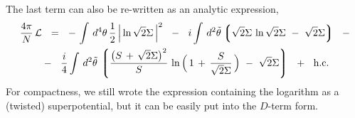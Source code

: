 \documentclass[epsfig,12pt]{article}
\newcommand{\cell}{{\mathcal L}}
\newcommand{\lgr}{\left\lgroup}
\newcommand{\rgr}{\right\rgroup}
\begin{document}
	The last term can also be re-written as an analytic expression,
\begin{align}
%
\notag
	\frac{4\pi}{N}\, \cell &    ~~=~~     
			-\,
			\int\, d^4\theta\, \frac{1}{2}\, \Big| \ln \sqrt{2}\Sigma \, \Big|^2
			~~-~~
			i \int\, d^2\tilde\theta 
			\lgr
			\sqrt{2}\Sigma\, \ln \sqrt{2}\Sigma  ~-~ \sqrt{2}\Sigma
			\rgr
			~~-
	\\
%
\label{Lsuper}
			&
			-~~ 
			\frac{i}{4} \int\, d^2\tilde\theta\,
			\lgr \frac{ \big( S \,+\, \sqrt{2}\Sigma \big)^2 }{ S }\,
				\ln \Big(\, 1 \,+\, \frac{S}{\sqrt{2}\Sigma} \,\Big) ~-~
				\sqrt{2}\Sigma \rgr
			~~+~~ \text{h.c.}
\end{align}
	For compactness, we still wrote the expression containing the logarithm as a (twisted) superpotential,
	but it can be easily put into the $ D $-term form.
\end{document}
